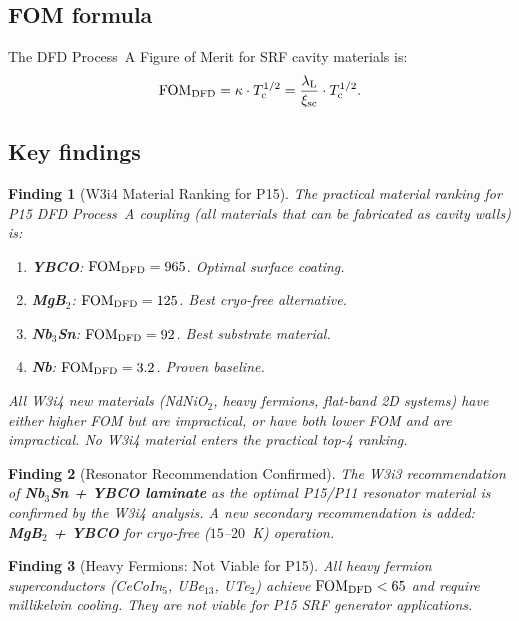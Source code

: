\documentclass[11pt]{article}
\newtheorem{finding}{Finding}
\newcommand{\lambdaL}{\lambda_{\rm L}}
\newcommand{\xsc}{\xi_{\rm sc}}
\newcommand{\Tc}{T_{\rm c}}
\newcommand{\FOM}{\mathrm{FOM}}
\begin{document}
\subsection{FOM formula}

The DFD Process~A Figure of Merit for SRF cavity materials is:
\begin{equation}
\FOM_{\rm DFD} = \kappa \cdot \Tc^{1/2} = \frac{\lambdaL}{\xsc} \cdot \Tc^{1/2}.
\end{equation}

\subsection{Key findings}

\begin{finding}[W3i4 Material Ranking for P15]
\label{finding:ranking}
The practical material ranking for P15 DFD Process~A coupling (all materials
that can be fabricated as cavity walls) is:
\begin{enumerate}
\item \textbf{YBCO}: $\FOM_{\rm DFD} = 965$. Optimal surface coating.
\item \textbf{MgB$_2$}: $\FOM_{\rm DFD} = 125$. Best cryo-free alternative.
\item \textbf{Nb$_3$Sn}: $\FOM_{\rm DFD} = 92$. Best substrate material.
\item \textbf{Nb}: $\FOM_{\rm DFD} = 3.2$. Proven baseline.
\end{enumerate}
All W3i4 new materials (NdNiO$_2$, heavy fermions, flat-band 2D systems)
have either higher FOM but are impractical, or have both lower FOM and
are impractical. No W3i4 material enters the practical top-4 ranking.
\end{finding}

\begin{finding}[Resonator Recommendation Confirmed]
\label{finding:resonator}
The W3i3 recommendation of \textbf{Nb$_3$Sn + YBCO laminate} as the
optimal P15/P11 resonator material is \emph{confirmed} by the W3i4 analysis.
A new secondary recommendation is added: \textbf{MgB$_2$ + YBCO} for
cryo-free ($15$--$20$~K) operation.
\end{finding}

\begin{finding}[Heavy Fermions: Not Viable for P15]
\label{finding:hf-final}
All heavy fermion superconductors (CeCoIn$_5$, UBe$_{13}$, UTe$_2$) achieve
$\FOM_{\rm DFD} < 65$ and require millikelvin cooling. They are not viable
for P15 SRF generator applications.
\end{finding}
\end{document}
